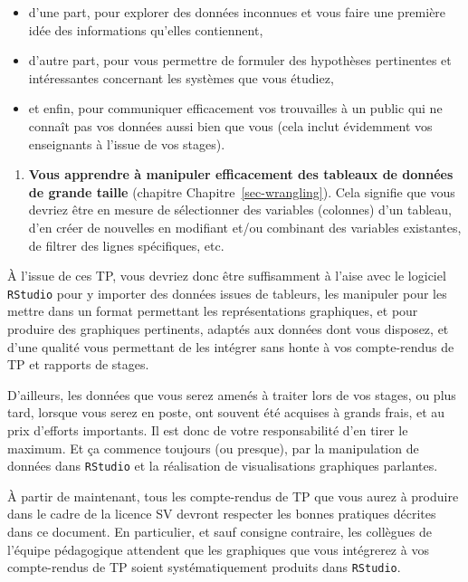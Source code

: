 \documentclass[
  a4paper,
  DIV=11,
  numbers=noendperiod,
  oneside]{scrreprt}
\providecommand{\tightlist}{%
  \setlength{\itemsep}{0pt}\setlength{\parskip}{0pt}}\usepackage{longtable,booktabs,array}
\begin{document}
\begin{itemize}
\tightlist
\item
  d'une part, pour explorer des données inconnues et vous faire une
  première idée des informations qu'elles contiennent,
\item
  d'autre part, pour vous permettre de formuler des hypothèses
  pertinentes et intéressantes concernant les systèmes que vous étudiez,
\item
  et enfin, pour communiquer efficacement vos trouvailles à un public
  qui ne connaît pas vos données aussi bien que vous (cela inclut
  évidemment vos enseignants à l'issue de vos stages).
\end{itemize}

\begin{enumerate}
\def\labelenumi{\arabic{enumi}.}
\setcounter{enumi}{2}
\tightlist
\item
  \textbf{Vous apprendre à manipuler efficacement des tableaux de
  données de grande taille} (chapitre Chapitre~\ref{sec-wrangling}).
  Cela signifie que vous devriez être en mesure de sélectionner des
  variables (colonnes) d'un tableau, d'en créer de nouvelles en
  modifiant et/ou combinant des variables existantes, de filtrer des
  lignes spécifiques, etc.
\end{enumerate}

À l'issue de ces TP, vous devriez donc être suffisamment à l'aise avec
le logiciel \texttt{RStudio} pour y importer des données issues de
tableurs, les manipuler pour les mettre dans un format permettant les
représentations graphiques, et pour produire des graphiques pertinents,
adaptés aux données dont vous disposez, et d'une qualité vous permettant
de les intégrer sans honte à vos compte-rendus de TP et rapports de
stages.

D'ailleurs, les données que vous serez amenés à traiter lors de vos
stages, ou plus tard, lorsque vous serez en poste, ont souvent été
acquises à grands frais, et au prix d'efforts importants. Il est donc de
votre responsabilité d'en tirer le maximum. Et ça commence toujours (ou
presque), par la manipulation de données dans \texttt{RStudio} et la
réalisation de visualisations graphiques parlantes.

\begin{tcolorbox}[enhanced jigsaw, coltitle=black, toprule=.15mm, opacityback=0, breakable, colback=white, opacitybacktitle=0.6, colframe=quarto-callout-important-color-frame, leftrule=.75mm, rightrule=.15mm, titlerule=0mm, bottomtitle=1mm, toptitle=1mm, arc=.35mm, title=\textcolor{quarto-callout-important-color}{\faExclamation}\hspace{0.5em}{Important}, colbacktitle=quarto-callout-important-color!10!white, bottomrule=.15mm, left=2mm]

À partir de maintenant, tous les compte-rendus de TP que vous aurez à
produire dans le cadre de la licence SV devront respecter les bonnes
pratiques décrites dans ce document. En particulier, et sauf consigne
contraire, les collègues de l'équipe pédagogique attendent que les
graphiques que vous intégrerez à vos compte-rendus de TP soient
systématiquement produits dans \texttt{RStudio}.

\end{tcolorbox}
\end{document}
